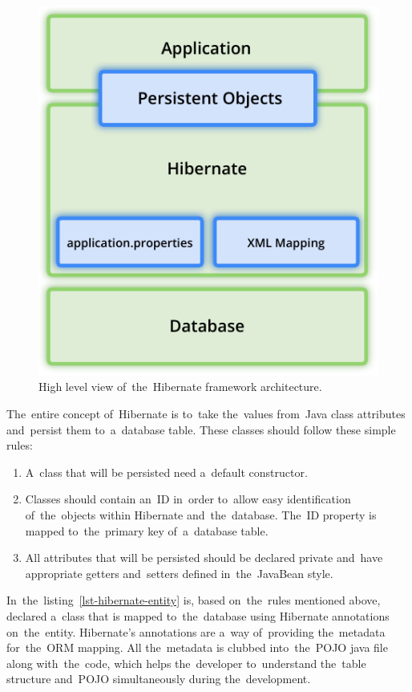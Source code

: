 \begin{figure}[!hbt]
	\centering
	\includegraphics[scale=0.8]{./figures/hibernate-architecture.pdf}
	\caption{High level view of~the~Hibernate framework architecture.}
\end{figure}

The~entire concept of~Hibernate is to~take the~values from~Java class attributes
and~persist them to~a~database table. These classes should follow these simple
rules:

\begin{enumerate}
  \item A~class that will be persisted need a~default constructor.
  \item Classes should contain an~ID in~order to~allow easy identification
  of~the~objects within Hibernate and~the~database. The~ID property is mapped
  to~the~primary key of~a~database table.
  \item All attributes that will be persisted should be declared private
  and~have appropriate getters and~setters defined in~the~JavaBean style.
\end{enumerate}

In~the~listing~\ref{lst-hibernate-entity} is, based on~the~rules mentioned
above, declared a~class that is mapped to~the~database using Hibernate
annotations on~the~entity. Hibernate's annotations are a~way of~providing
the~metadata for~the~ORM mapping. All the~metadata is clubbed into~the~POJO java
file along with~the~code, which helps the~developer to~understand the~table
structure and~POJO simultaneously during the~development.

